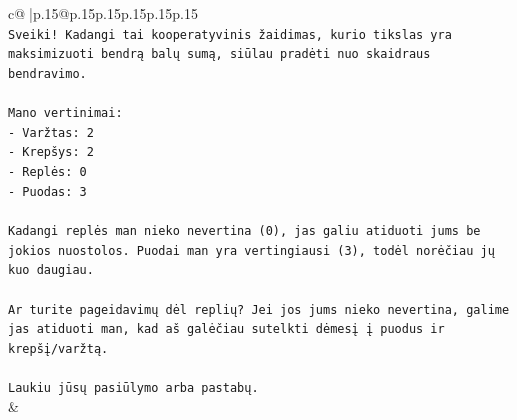 \documentclass{article}
\begin{document}
{\begin{supertabular}{c@{$\;$}|p{.15\linewidth}@{}p{.15\linewidth}p{.15\linewidth}p{.15\linewidth}p{.15\linewidth}p{.15\linewidth}}
{{{\\ 
\texttt{Sveiki! Kadangi tai kooperatyvinis žaidimas, kurio tikslas yra maksimizuoti bendrą balų sumą, siūlau pradėti nuo skaidraus bendravimo.} \\
\\ 
\texttt{Mano vertinimai:} \\
\texttt{{-} Varžtas: 2} \\
\texttt{{-} Krepšys: 2} \\
\texttt{{-} Replės: 0} \\
\texttt{{-} Puodas: 3} \\
\\ 
\texttt{Kadangi replės man nieko nevertina (0), jas galiu atiduoti jums be jokios nuostolos. Puodai man yra vertingiausi (3), todėl norėčiau jų kuo daugiau.} \\
\\ 
\texttt{Ar turite pageidavimų dėl replių? Jei jos jums nieko nevertina, galime jas atiduoti man, kad aš galėčiau sutelkti dėmesį į puodus ir krepšį/varžtą.} \\
\\ 
\texttt{Laukiu jūsų pasiūlymo arba pastabų.} \\
            }
        }
    }
    & \\ \\


\end{supertabular}}
\end{document}
